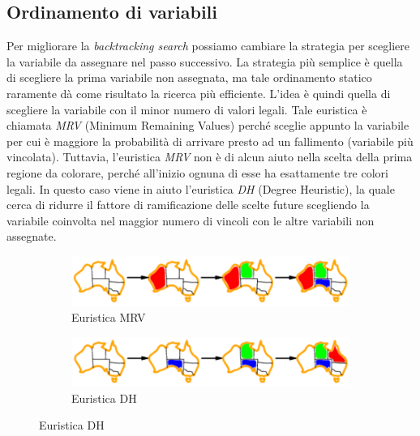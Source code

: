 \documentclass[11pt,oneside]{book}
\begin{document}
\subsection{Ordinamento di variabili}
Per migliorare la \textit{backtracking search} possiamo cambiare la strategia per scegliere la variabile da assegnare nel passo successivo. La strategia più semplice è quella di scegliere la prima variabile non assegnata, ma tale ordinamento statico raramente dà come risultato la ricerca più efficiente. L'idea è quindi quella di scegliere la variabile con il minor numero di valori legali. Tale euristica è chiamata \textit{MRV} (Minimum Remaining Values) perché sceglie appunto la variabile per cui è maggiore la probabilità di arrivare presto ad un fallimento (variabile più vincolata). Tuttavia, l'euristica \textit{MRV} non è di alcun aiuto nella scelta della prima regione da colorare, perché all'inizio ognuna di esse ha esattamente tre colori legali. In questo caso viene in aiuto l'euristica \textit{DH} (Degree Heuristic), la quale cerca di ridurre il fattore di ramificazione delle scelte future scegliendo la variabile coinvolta nel maggior numero di vincoli con le altre variabili non assegnate.
\begin{figure}[htp]
	\begin{subfigure}{0.49\textwidth}
	    \centering
		\includegraphics[width=\textwidth, height=\textheight, keepaspectratio]{mrv.png}
		\caption{Euristica MRV}
	\end{subfigure}
	\hfill
	\begin{subfigure}{0.49\textwidth}
	    \centering
		\includegraphics[width=\textwidth, height=\textheight, keepaspectratio]{dh.png}
		\caption{Euristica DH}
	\end{subfigure}
\end{figure}
\end{document}
